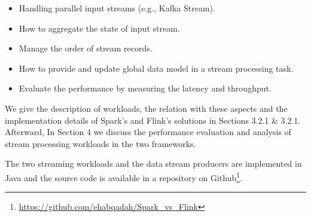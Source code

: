 \documentclass[]{article}
\begin{document}
\begin{itemize}
\item Handling parallel input streams (e.g., Kafka Stream).
\item How to aggregate the state of input stream.
\item Manage the order of stream records.
\item How to provide and update global data model in a stream processing task.
\item Evaluate the performance by measuring the latency and throughput.
\end{itemize}
We give the description of workloads, the relation with these aspects and  the implementation details of Spark's and Flink's solutions in Sections 3.2.1 \& 3.2.1. Afterward, In Section 4 we discuss the performance evaluation and analysis of stream processing workloads in the two frameworks. 
\par The two streaming workloads and the data stream producers are implemented in Java and the source code is available in a repository on Github\footnote{\url{https://github.com/ehabqadah/Spark_vs_Flink}}. 
\end{document}
